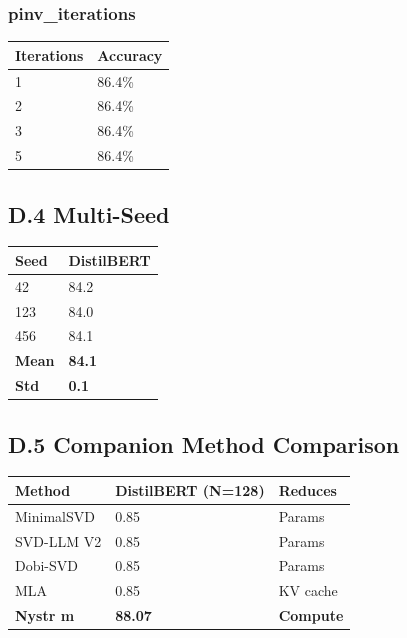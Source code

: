 \subsubsection{pinv\_iterations}

\begin{table}[H]
\centering
\small
\begin{tabular}{ll}
\toprule
\textbf{Iterations} & \textbf{Accuracy} \\
\midrule
1 & 86.4\% \\
2 & 86.4\% \\
3 & 86.4\% \\
5 & 86.4\% \\
\bottomrule
\end{tabular}
\end{table}

\subsection{D.4 Multi-Seed}

\begin{table}[H]
\centering
\small
\begin{tabular}{ll}
\toprule
\textbf{Seed} & \textbf{DistilBERT} \\
\midrule
42 & 84.2 \\
123 & 84.0 \\
456 & 84.1 \\
\textbf{Mean} & \textbf{84.1} \\
\textbf{Std} & \textbf{0.1} \\
\bottomrule
\end{tabular}
\end{table}

\subsection{D.5 Companion Method Comparison}

\begin{table}[H]
\centering
\small
\begin{tabular}{lll}
\toprule
\textbf{Method} & \textbf{DistilBERT (N=128)} & \textbf{Reduces} \\
\midrule
MinimalSVD & 0.85 & Params \\
SVD-LLM V2 & 0.85 & Params \\
Dobi-SVD & 0.85 & Params \\
MLA & 0.85 & KV cache \\
\textbf{Nystr m} & \textbf{88.07} & \textbf{Compute} \\
\bottomrule
\end{tabular}
\end{table}

